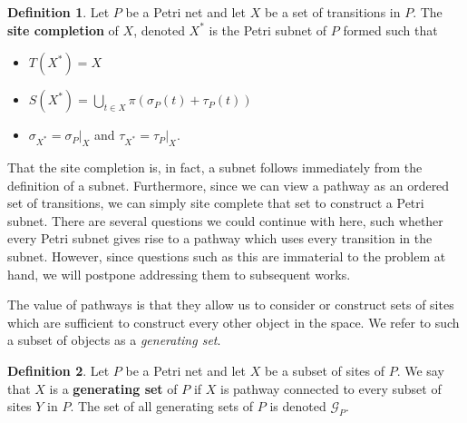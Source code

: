\documentclass[aps,prd,onecolumn,nofootinbib,letterpaper,preprintnumbers,superscriptaddress,eqsecnum]{revtex4}
\theoremstyle{definition}
\newtheorem{definition}{Definition}
\newcommand{\G}{\mathcal{G}}
\begin{document}
\begin{definition}\label{def:site-completion}
    Let $P$ be a Petri net and let $X$ be a set of transitions in $P$.
    The \textbf{site completion} of $X$, denoted $X^*$ is the Petri subnet of $P$ formed such that
    \begin{itemize}
        \item $T(X^*) = X$
        \item $\displaystyle S(X^*) = \bigcup_{t \in X} \pi(\sigma_P(t) + \tau_P(t))$
        \item $\sigma_{X^*} = \sigma_P|_X$ and $\tau_{X^*} = \tau_P|_X$.
    \end{itemize}
\end{definition}

That the site completion is, in fact, a subnet follows immediately from the definition of a subnet.
Furthermore, since we can view a pathway as an ordered set of transitions, we can simply site complete that set to construct a Petri subnet.
There are several questions we could continue with here, such whether every Petri subnet gives rise to a pathway which uses every transition in the subnet.
However, since questions such as this are immaterial to the problem at hand, we will postpone addressing them to subsequent works.

The value of pathways is that they allow us to consider or construct sets of sites which are sufficient to construct every other object in the space.
We refer to such a subset of objects as a \textit{generating set}.

\begin{definition}\label{def:generating-set}
    Let $P$ be a Petri net and let $X$ be a subset of sites of $P$.
    We say that $X$ is a \textbf{generating set} of $P$ if $X$ is pathway connected to every subset of sites $Y$ in $P$.
    The set of all generating sets of $P$ is denoted $\G_P$.
\end{definition}
\end{document}
